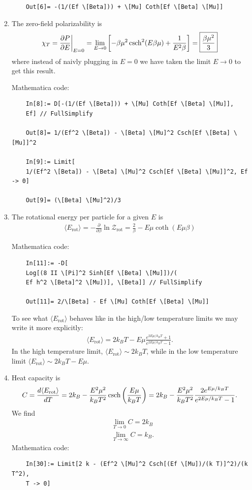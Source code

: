 \documentclass{article}
\theoremstyle{definition}
\newcommand{\p}{\partial}
\newcommand{\be}{\beta}
\newcommand{\f}[2]{\frac{#1}{#2}}
\newcommand{\lp}{\left(}
\newcommand{\rp}{\right)}
\newcommand{\lb}{\left[}
\newcommand{\rb}{\right]}
\begin{document}
\begin{enumerate}[label=(\alph*)]
\begin{lstlisting}
	Out[6]= -(1/(Ef \[Beta])) + \[Mu] Coth[Ef \[Beta] \[Mu]]
	\end{lstlisting}
	
	\item The zero-field polarizability is 
	\begin{align*}
	\chi_T = \f{\p P}{\p E}\bigg\vert_{E=0} = \lim_{E\to 0} \lb -\be \mu^2 \csch^2(E\be\mu)  + \f{1}{E^2\be}\rb = \boxed{\f{\be\mu^2}{3}}
	\end{align*}
	where instead of naivly plugging in $E=0$ we have taken the limit $E\to 0$ to get this result. 
	
	Mathematica code:
	\begin{lstlisting}
	In[8]:= D[-(1/(Ef \[Beta])) + \[Mu] Coth[Ef \[Beta] \[Mu]], 
	Ef] // FullSimplify
	
	Out[8]= 1/(Ef^2 \[Beta]) - \[Beta] \[Mu]^2 Csch[Ef \[Beta] \[Mu]]^2
	
	In[9]:= Limit[
	1/(Ef^2 \[Beta]) - \[Beta] \[Mu]^2 Csch[Ef \[Beta] \[Mu]]^2, Ef -> 0]
	
	Out[9]= (\[Beta] \[Mu]^2)/3
	\end{lstlisting}
	
	\item The rotational energy per particle for a given $E$ is 
	\begin{align*}
	\langle E_\text{rot}\rangle = -\f{\p}{\p \be}\ln \mathcal{Z}_\text{rot} = \boxed{\f{2}{\be} - E\mu\coth(E\mu\be)}
	\end{align*}
	
	Mathematica code:
	\begin{lstlisting}
	In[11]:= -D[
	Log[(8 II \[Pi]^2 Sinh[Ef \[Beta] \[Mu]])/(
	Ef h^2 \[Beta]^2 \[Mu])], \[Beta]] // FullSimplify
	
	Out[11]= 2/\[Beta] - Ef \[Mu] Coth[Ef \[Beta] \[Mu]]
	\end{lstlisting}
	
	To see what $\langle E_\text{rot}\rangle$ behaves like in the high/low temperature limits we may write it more explicitly:
	\begin{align*}
	\langle E_\text{rot}\rangle = 2k_BT -E\mu \f{e^{2E\mu/k_BT} + 1}{e^{2E\mu/k_BT} - 1}.
	\end{align*}
	In the high temperature limit, $\boxed{\langle E_\text{rot}\rangle \sim 2k_BT}$, while in the low temperature limit $\boxed{\langle E_\text{rot}\rangle \sim   2k_BT - E\mu   }$.
	
	\item Heat capacity is 
	\begin{align*}
	C = \f{d\langle E_\text{rot}\rangle}{dT} = 2k_B - \f{E^2\mu^2}{k_BT^2}\csch\lp \f{E\mu}{k_BT} \rp = 2k_B - \f{E^2\mu^2}{k_BT^2}\f{2e^{E\mu/k_BT}}{e^{2E\mu/k_BT}-1}.
	\end{align*}
	We find 
	\begin{align*}
	&\lim_{T\to 0} C = 2k_B \\
	&\lim_{T\to \infty} C = k_B.
	\end{align*}
	Mathematica code:
	\begin{lstlisting}
	In[30]:= Limit[2 k - (Ef^2 \[Mu]^2 Csch[(Ef \[Mu])/(k T)]^2)/(k T^2), 
	T -> 0]
	

\end{lstlisting}
\end{enumerate}
\end{document}
